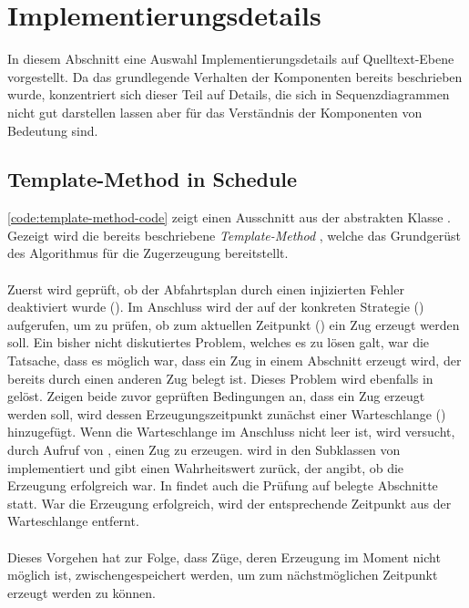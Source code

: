 \section{Implementierungsdetails}

In diesem Abschnitt eine Auswahl Implementierungsdetails auf Quelltext-Ebene vorgestellt. Da das grundlegende Verhalten der Komponenten bereits beschrieben wurde, konzentriert sich dieser Teil auf Details, die sich in Sequenzdiagrammen nicht gut darstellen lassen aber für das Verständnis der Komponenten von Bedeutung sind.

\subsection{Template-Method in Schedule}

\autoref{code:template-method-code} zeigt einen Ausschnitt aus der abstrakten Klasse . Gezeigt wird die bereits beschriebene \emph{Template-Method} , welche das Grundgerüst des Algorithmus für die Zugerzeugung bereitstellt.\\
\\
Zuerst wird geprüft, ob der Abfahrtsplan durch einen injizierten Fehler deaktiviert wurde (). Im Anschluss wird der  auf der konkreten Strategie () aufgerufen, um zu prüfen, ob zum aktuellen Zeitpunkt () ein Zug erzeugt werden soll. Ein bisher nicht diskutiertes Problem, welches es zu lösen galt, war die Tatsache, dass es möglich war, dass ein Zug in einem Abschnitt erzeugt wird, der bereits durch einen anderen Zug belegt ist. Dieses Problem wird ebenfalls in  gelöst. Zeigen beide zuvor geprüften Bedingungen an, dass ein Zug erzeugt werden soll, wird dessen Erzeugungszeitpunkt zunächst einer Warteschlange () hinzugefügt. Wenn die Warteschlange im Anschluss nicht leer ist, wird versucht, durch Aufruf von , einen Zug zu erzeugen.  wird in den Subklassen von  implementiert und gibt einen Wahrheitswert zurück, der angibt, ob die Erzeugung erfolgreich war. In  findet auch die Prüfung auf belegte Abschnitte statt. War die Erzeugung erfolgreich, wird der entsprechende Zeitpunkt aus der Warteschlange entfernt.\\
\\
Dieses Vorgehen hat zur Folge, dass Züge, deren Erzeugung im Moment nicht möglich ist, zwischengespeichert werden, um zum nächstmöglichen Zeitpunkt erzeugt werden zu können.

